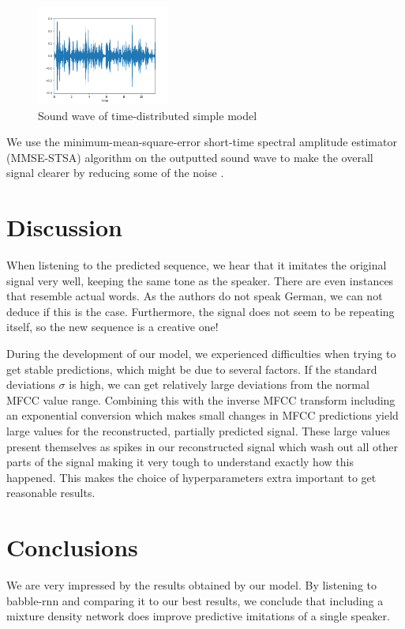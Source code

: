\documentclass[conference]{IEEEtran}
\begin{document}
\begin{figure}[ht] 
  \centering %
  \includegraphics[width=0.39\textwidth]{./best/BEST2.png} 
  \caption{Sound wave of time-distributed simple model}
  \label{fig5} 
\end{figure}

We use the minimum-mean-square-error short-time spectral amplitude estimator (MMSE-STSA) algorithm on the outputted sound wave to make the overall signal clearer by reducing some of the noise \cite{b9}.

\section{Discussion}
When listening to the predicted sequence, we hear that it imitates the original signal very well, keeping the same tone as the speaker. There are even instances that resemble actual words. As the authors do not speak German, we can not deduce if this is the case. Furthermore, the signal does not seem to be repeating itself, so the new sequence is a creative one!

During the development of our model, we experienced difficulties when trying to get stable predictions, which might be due to several factors. If the standard deviations \boldmath$\sigma$ is high, we can get relatively large deviations from the normal MFCC value range. Combining this with the inverse MFCC transform including an exponential conversion which makes small changes in MFCC predictions yield large values for the reconstructed, partially predicted signal. These large values present themselves as spikes in our reconstructed signal which wash out all other parts of the signal making it very tough to understand exactly how this happened. This makes the choice of hyperparameters extra important to get reasonable results. \unboldmath

\section{Conclusions}
We are very impressed by the results obtained by our model. By listening to babble-rnn and comparing it to our best results, we conclude that including a mixture density network does improve predictive imitations of a single speaker. 
\end{document}
